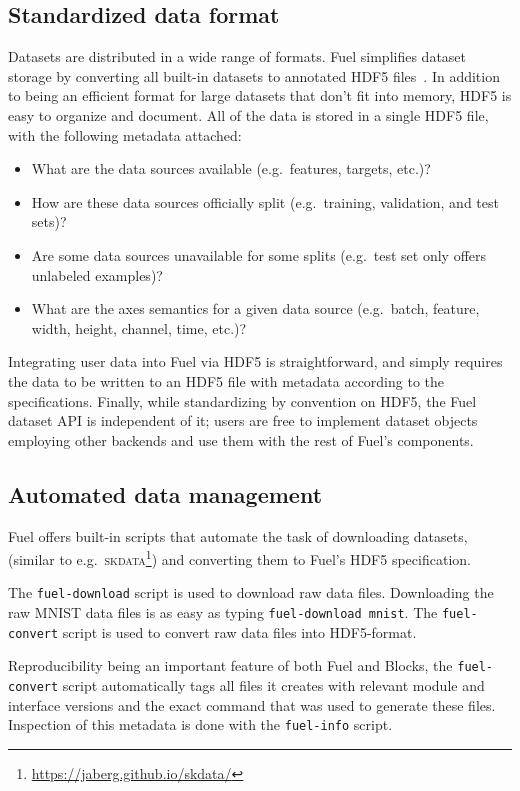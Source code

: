 \documentclass[twoside,11pt]{article}
\begin{document}
\subsection{Standardized data format}

Datasets are distributed in a wide range of formats. Fuel simplifies dataset
storage by converting all built-in datasets to annotated HDF5
files~\citep{hdf5}. In addition to being
an efficient format for large datasets that don't fit into memory, HDF5 is easy
to organize and document. All of the data is stored in a single HDF5 file, with
the following metadata attached:

\begin{itemize}
  \item What are the data sources available (e.g.\ features, targets, etc.)?
  \item How are these data sources officially split (e.g.\ training, validation,
        and test sets)?
  \item Are some data sources unavailable for some splits (e.g.\ test set only
        offers unlabeled examples)?
  \item What are the axes semantics for a given data source (e.g.\ batch,
        feature, width, height, channel, time, etc.)?
\end{itemize}

Integrating user data into Fuel via HDF5 is straightforward, and simply requires
the data to be written to an HDF5 file with metadata according to the specifications.
Finally, while standardizing by convention on HDF5, the Fuel dataset API is
independent of it; users are free to implement dataset objects employing other backends
and use them with the rest of Fuel's components.

\subsection{Automated data management}

Fuel offers built-in scripts that automate the task of downloading datasets,
(similar to e.g.\ \textsc{skdata}\footnote{\url{https://jaberg.github.io/skdata/}})
and converting them to Fuel's HDF5 specification.

The \lstinline$fuel-download$ script is used to download raw data files.
Downloading the raw MNIST data files is as easy as typing
\lstinline$fuel-download mnist$. The \lstinline$fuel-convert$ script is used to
convert raw data files into HDF5-format.

Reproducibility being an important feature of both Fuel and Blocks, the
\lstinline$fuel-convert$ script automatically tags all files it creates with
relevant module and interface versions and the exact command that was used to
generate these files. Inspection of this metadata is done with the
\lstinline$fuel-info$ script.
\end{document}
